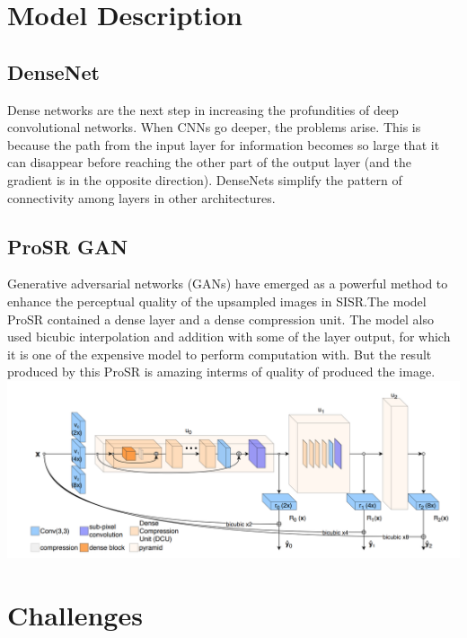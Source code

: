 \documentclass[a4paper,12pt]{article}
\begin{document}
\section{Model Description}

\subsection{DenseNet}
Dense networks are the next step in increasing the profundities of deep convolutional networks. When CNNs go deeper, the problems arise. This is because the path from the input layer for information becomes so large that it can disappear before reaching the other part of the output layer (and the gradient is in the opposite direction). DenseNets simplify the pattern of connectivity among layers in other architectures. 

\subsection{ProSR GAN}
Generative adversarial networks (GANs) have emerged as a powerful method to enhance the perceptual quality of the upsampled images in SISR.The model ProSR contained a dense layer and a dense compression unit. The model also used bicubic interpolation and addition with some of the layer output, for which it is one of the expensive model to perform computation with. But the result produced by this ProSR is amazing interms of quality of produced the image.
\cite{ref1}
\\
\includegraphics[width=\linewidth]{prosr.png}

\section{Challenges}
\end{document}
